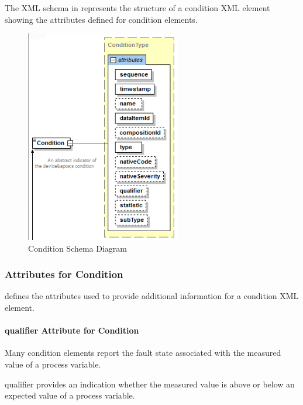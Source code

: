 The XML schema in  represents the structure of a \gls{condition} XML element showing the attributes defined for \gls{condition} elements.

\begin{figure}[ht]
  \centering
  \includegraphics[width=0.6\textwidth]{figures/condition-schema-diagram.png}
  \caption{Condition Schema Diagram}
  \label{fig:condition-schema-diagram}
\end{figure}
\FloatBarrier

\subsubsection{Attributes for Condition}

 defines the attributes used to provide additional information for a \gls{condition} XML element.



\paragraph{qualifier Attribute for Condition}\mbox{}

Many \gls{condition} elements report the \gls{fault state} associated with the measured value of a process variable.

\gls{qualifier} provides an indication whether the measured value is above or below an expected value of a process variable.

